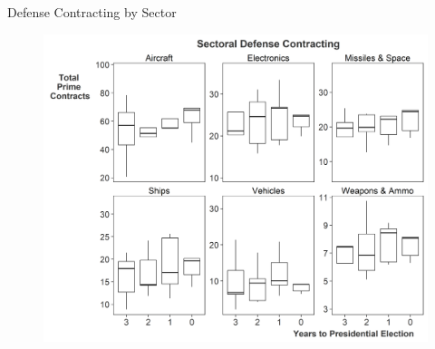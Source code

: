 \documentclass[12pt]{beamer}
\begin{document}

\begin{frame}{Defense Contracting by Sector}

\begin{figure}[htbp]
	\centering
		\includegraphics[height=.90\textheight]{contract-cycles-sector.png}
\end{figure}


\end{frame}





\end{document}
